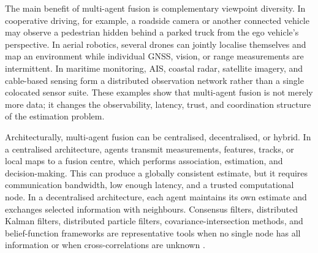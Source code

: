 \documentclass{ieeeaccess}
\begin{document}
The main benefit of multi-agent fusion is complementary viewpoint diversity. In cooperative driving, for example, a roadside camera or another connected vehicle may observe a pedestrian hidden behind a parked truck from the ego vehicle's perspective. In aerial robotics, several drones can jointly localise themselves and map an environment while individual GNSS, vision, or range measurements are intermittent. In maritime monitoring, AIS, coastal radar, satellite imagery, and cable-based sensing form a distributed observation network rather than a single colocated sensor suite. These examples show that multi-agent fusion is not merely more data; it changes the observability, latency, trust, and coordination structure of the estimation problem.

Architecturally, multi-agent fusion can be centralised, decentralised, or hybrid. In a centralised architecture, agents transmit measurements, features, tracks, or local maps to a fusion centre, which performs association, estimation, and decision-making. This can produce a globally consistent estimate, but it requires communication bandwidth, low enough latency, and a trusted computational node. In a decentralised architecture, each agent maintains its own estimate and exchanges selected information with neighbours. Consensus filters, distributed Kalman filters, distributed particle filters, covariance-intersection methods, and belief-function frameworks are representative tools when no single node has all information or when cross-correlations are unknown \cite{khaleghi_multisensor_2013,foglietta_networked_2012}.
\end{document}
